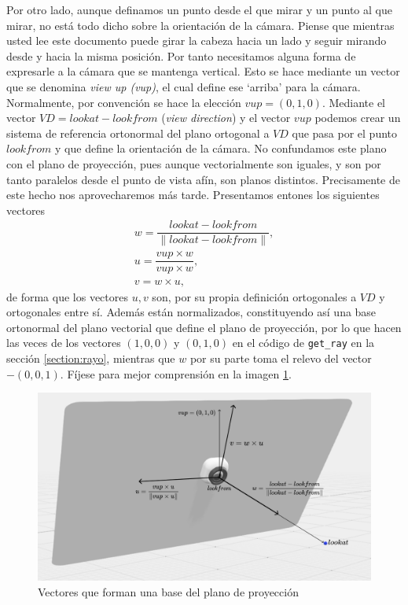 Por otro lado, aunque definamos un punto desde el que mirar y un punto al que mirar, no está todo dicho sobre la orientación de la cámara. Piense que mientras usted lee este documento puede girar la cabeza hacia un lado y seguir mirando desde y hacia la misma posición. Por tanto necesitamos alguna forma de expresarle a la cámara que se mantenga vertical. Esto se hace mediante un vector que se denomina \textit{view up (vup)}, el cual define ese `arriba' para la cámara. Normalmente, por convención se hace la elección $vup=(0,1,0)$. Mediante el vector $VD=lookat-lookfrom$ (\textit{view direction}) y el vector $vup$ podemos crear un sistema de referencia ortonormal del plano ortogonal a $VD$ que pasa por el punto $lookfrom$ y que define la orientación de la cámara. No confundamos este plano con el plano de proyección, pues aunque vectorialmente son iguales, y son por tanto paralelos desde el punto de vista afín, son planos distintos. Precisamente de este hecho nos aprovecharemos más tarde. Presentamos entones los siguientes vectores
\begin{eqnarray*}
    w = \dfrac{lookat-lookfrom}{\|lookat-lookfrom\|}, \\
    u = \dfrac{vup\times w}{vup \times w}, \\
    v = w\times u,
\end{eqnarray*}
de forma que los vectores $u,v$ son, por su propia definición ortogonales a $VD$ y ortogonales entre sí. Además están normalizados, constituyendo así una base ortonormal del plano vectorial que define el plano de proyección, por lo que hacen las veces de los vectores $(1,0,0)$ y $(0,1,0)$ en el código de \verb|get_ray| en la sección \ref{section:rayo}, mientras que $w$ por su parte toma el relevo del vector $-(0,0,1)$. Fíjese para mejor comprensión en la imagen \ref{fig:vectores}.

\begin{figure} [ht]
    \centering
    \includegraphics[scale = 0.3]{img/C7/plano.png}
    \caption{Vectores que forman una base del plano de proyección}
    \label{fig:vectores}
\end{figure}

